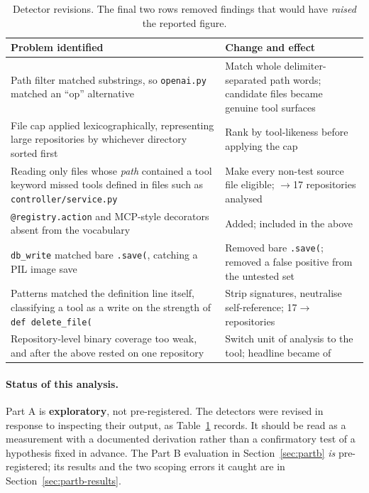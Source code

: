 \documentclass[11pt]{article}
\begin{document}
\begin{table}[t]
\centering
\small
\begin{tabular}{p{}p{}}
\toprule
Problem identified & Change and effect \\
\midrule
Path filter matched substrings, so \texttt{openai.py} matched an ``op'' alternative &
Match whole delimiter-separated path words; candidate files became genuine tool surfaces \\
File cap applied lexicographically, representing large repositories by whichever
directory sorted first & Rank by tool-likeness before applying the cap \\
Reading only files whose \emph{path} contained a tool keyword missed tools defined in
files such as \texttt{controller/service.py} & Make every non-test source file eligible;
\AcRepos{}$\rightarrow$17 repositories analysed \\
\texttt{@registry.action} and MCP-style decorators absent from the vocabulary & Added;
included in the above \\
\texttt{db\_write} matched bare \texttt{.save(}, catching a PIL image save & Removed bare
\texttt{.save(}; removed a false positive from the untested set \\
Patterns matched the definition line itself, classifying a tool as a write on the
strength of \texttt{def delete\_file(} & Strip signatures, neutralise self-reference;
17$\rightarrow$\AcRepos{} repositories \\
Repository-level binary coverage too weak, and after the above rested on one repository
& Switch unit of analysis to the tool; headline became \AcUncoveredPct{} of \AcTools{} \\
\bottomrule
\end{tabular}
\caption{Detector revisions. The final two rows removed findings that would have
\emph{raised} the reported figure.}
\label{tab:revisions}
\end{table}

\paragraph{Status of this analysis.} Part A is \textbf{exploratory}, not
pre-registered. The detectors were revised in response to inspecting their output, as
Table~\ref{tab:revisions} records. It should be read as a measurement with a documented
derivation rather than a confirmatory test of a hypothesis fixed in advance. The Part B
evaluation in Section~\ref{sec:partb} \emph{is} pre-registered; its results and the two
scoping errors it caught are in Section~\ref{sec:partb-results}.
\end{document}
